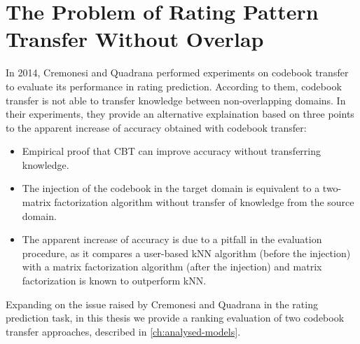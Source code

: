 \section{The Problem of Rating Pattern Transfer Without Overlap}

In 2014, Cremonesi and Quadrana \cite{10.1145/2645710.2645769} performed experiments on codebook transfer to evaluate its performance in rating prediction. According to them, codebook transfer is not able to transfer knowledge between non-overlapping domains. In their experiments, they provide an alternative explaination based on three points to the apparent increase of accuracy obtained with codebook transfer:
\begin{itemize}
\item Empirical proof that CBT can improve accuracy without transferring knowledge.
\item The injection of the codebook in the target domain is equivalent to a two-matrix factorization algorithm without transfer of knowledge from the source domain.
\item The apparent increase of accuracy is due to a pitfall in the evaluation procedure, as it compares a user-based kNN algorithm (before the injection) with a matrix factorization algorithm (after the injection) and matrix factorization is known to outperform kNN.
\end{itemize}
Expanding on the issue raised by Cremonesi and Quadrana in the rating prediction task, in this thesis we provide a ranking evaluation of two codebook transfer approaches, described in \autoref{ch:analysed-models}.